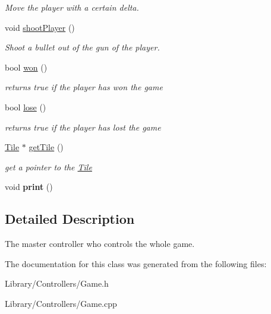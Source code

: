 \begin{DoxyCompactItemize}
\begin{DoxyCompactList}\small\item\em Move the player with a certain delta. \end{DoxyCompactList}\item 
\hypertarget{classty_lib_1_1_game_a82c102e92f997e0ded34ae0e95d1c2b0}{}void \hyperlink{classty_lib_1_1_game_a82c102e92f997e0ded34ae0e95d1c2b0}{shoot\+Player} ()\label{classty_lib_1_1_game_a82c102e92f997e0ded34ae0e95d1c2b0}

\begin{DoxyCompactList}\small\item\em Shoot a bullet out of the gun of the player. \end{DoxyCompactList}\item 
\hypertarget{classty_lib_1_1_game_aa7a320fe63b0bf48adbd0e74129921ae}{}bool \hyperlink{classty_lib_1_1_game_aa7a320fe63b0bf48adbd0e74129921ae}{won} ()\label{classty_lib_1_1_game_aa7a320fe63b0bf48adbd0e74129921ae}

\begin{DoxyCompactList}\small\item\em returns true if the player has won the game \end{DoxyCompactList}\item 
\hypertarget{classty_lib_1_1_game_ab84271fa142410616ef863ee15ac1f09}{}bool \hyperlink{classty_lib_1_1_game_ab84271fa142410616ef863ee15ac1f09}{lose} ()\label{classty_lib_1_1_game_ab84271fa142410616ef863ee15ac1f09}

\begin{DoxyCompactList}\small\item\em returns true if the player has lost the game \end{DoxyCompactList}\item 
\hypertarget{classty_lib_1_1_game_a1ffb805b183c64d2f30b331a1cbdd65c}{}\hyperlink{classty_lib_1_1_tile}{Tile} $\ast$ \hyperlink{classty_lib_1_1_game_a1ffb805b183c64d2f30b331a1cbdd65c}{get\+Tile} ()\label{classty_lib_1_1_game_a1ffb805b183c64d2f30b331a1cbdd65c}

\begin{DoxyCompactList}\small\item\em get a pointer to the \hyperlink{classty_lib_1_1_tile}{Tile} \end{DoxyCompactList}\item 
\hypertarget{classty_lib_1_1_game_a691f8f85b6968b421e238c1ac798e4bf}{}void {\bfseries print} ()\label{classty_lib_1_1_game_a691f8f85b6968b421e238c1ac798e4bf}

\end{DoxyCompactItemize}


\subsection{Detailed Description}
The master controller who controls the whole game. 

The documentation for this class was generated from the following files\+:\begin{DoxyCompactItemize}
\item 
Library/\+Controllers/Game.\+h\item 
Library/\+Controllers/Game.\+cpp\end{DoxyCompactItemize}
